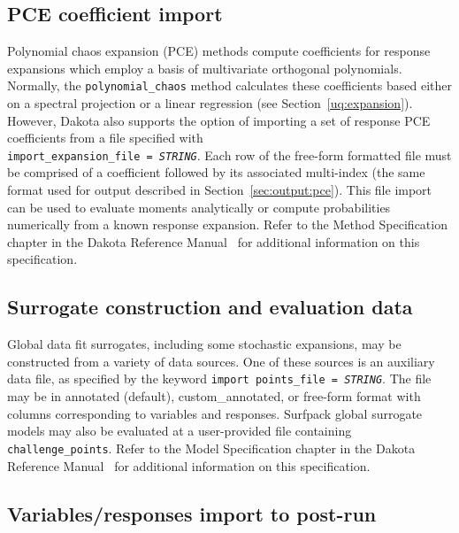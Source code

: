 \subsection{PCE coefficient import}

Polynomial chaos expansion (PCE) methods compute coefficients for
response expansions which employ a basis of multivariate orthogonal
polynomials.  Normally, the \texttt{polynomial\_chaos} method
calculates these coefficients based either on a spectral projection or
a linear regression (see Section~\ref{uq:expansion}).  However, Dakota
also supports the option of importing a set of response PCE
coefficients from a file specified with \\
\texttt{import\_expansion\_file = \emph{STRING}}.  Each row of the
free-form formatted file must be comprised of a coefficient followed
by its associated multi-index (the same format used for output
described in Section~\ref{sec:output:pce}).  This file import can be
used to evaluate moments analytically or compute probabilities
numerically from a known response expansion.  Refer to the Method
Specification chapter in the Dakota Reference Manual~\cite{RefMan} for
additional information on this specification.

\subsection{Surrogate construction and evaluation data}

Global data fit surrogates, including some stochastic expansions, may
be constructed from a variety of data sources.  One of these sources
is an auxiliary data file, as specified by the keyword \texttt{import\
  points\_file = \emph{STRING}}.  The file may be in annotated
(default), custom\_annotated, or free-form format with columns
corresponding to variables and responses.  Surfpack global surrogate
models may also be evaluated at a user-provided file containing
\texttt{challenge\_points}.  Refer to the Model Specification chapter
in the Dakota Reference Manual~\cite{RefMan} for additional
information on this specification.

\subsection{Variables/responses import to post-run}

